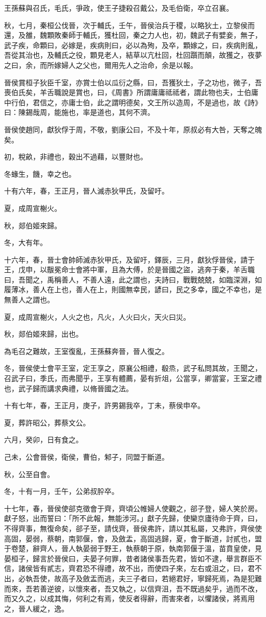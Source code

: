 \begin{pinyinscope}
王孫蘇與召氏，毛氏，爭政，使王子捷殺召戴公，及毛伯衛，卒立召襄。

秋，七月，秦桓公伐晉，次于輔氏，壬午，晉侯治兵于稷，以略狄土，立黎侯而還，及雒，魏顆敗秦師于輔氏，獲杜回，秦之力人也，初，魏武子有嬖妾，無子，武子疾，命顆曰，必嫁是，疾病則曰，必以為殉，及卒，顆嫁之，曰，疾病則亂，吾從其治也，及輔氏之役，顆見老人，結草以亢杜回，杜回躓而顛，故獲之，夜夢之曰，余，而所嫁婦人之父也，爾用先人之治命，余是以報。

晉侯賞桓子狄臣千室，亦賞士伯以瓜衍之縣，曰，吾獲狄土，子之功也，微子，吾喪伯氏矣，羊舌職說是賞也，曰，《周書》所謂庸庸祗祗者，謂此物也夫，士伯庸中行伯，君信之，亦庸士伯，此之謂明德矣，文王所以造周，不是過也，故《詩》曰：陳錫哉周，能施也，率是道也，其何不濟。

晉侯使趙同，獻狄俘于周，不敬，劉康公曰，不及十年，原叔必有大咎，天奪之魄矣。

初，稅畝，非禮也，穀出不過藉，以豐財也。

冬蝝生，饑，幸之也。

十有六年，春，王正月，晉人滅赤狄甲氏，及留吁。

夏，成周宣榭火。

秋，郯伯姬來歸。

冬，大有年。

十六年，春，晉士會帥師滅赤狄甲氏，及留吁，鐸辰，三月，獻狄俘晉侯，請于王，戊申，以黻冕命士會將中軍，且為大傅，於是晉國之盜，逃奔于秦，羊舌職曰，吾聞之，禹稱善人，不善人遠，此之謂也，夫詩曰，戰戰兢兢，如臨深淵，如履薄冰，善人在上也，善人在上，則國無幸民，諺曰，民之多幸，國之不幸也，是無善人之謂也。

夏，成周宣榭火，人火之也，凡火，人火曰火，天火曰災。

秋，郯伯姬來歸，出也。

為毛召之難故，王室復亂，王孫蘇奔晉，晉人復之。

冬，晉侯使士會平王室，定王享之，原襄公相禮，殽烝，武子私問其故，王聞之，召武子曰，季氏，而弗聞乎，王享有體薦，晏有折俎，公當享，卿當宴，王室之禮也，武子歸而講求典禮，以脩晉國之法。

十有七年，春，王正月，庚子，許男錫我卒，丁未，蔡侯申卒。

夏，葬許昭公，葬蔡文公。

六月，癸卯，日有食之。

己未，公會晉侯，衛侯，曹伯，邾子，同盟于斷道。

秋，公至自會。

冬，十有一月，壬午，公弟叔肸卒。

十七年，春，晉侯使郤克徵會于齊，齊頃公帷婦人使觀之，郤子登，婦人笑於房。獻子怒，出而誓曰：「所不此報，無能涉河。」獻子先歸，使欒京廬待命于齊，曰，不得齊事，無復命矣，郤子至，請伐齊，晉侯弗許，請以其私屬，又弗許，齊侯使高固，晏弱，蔡朝，南郭偃，會，及斂盂，高固逃歸，夏，會于斷道，討貳也，盟于卷楚，辭齊人，晉人執晏弱于野王，執蔡朝于原，執南郭偃于溫，苗賁皇使，見晏桓子，歸言於晉侯曰，夫晏子何罪，昔者諸侯事吾先君，皆如不逮，舉言群臣不信，諸侯皆有貳志，齊君恐不得禮，故不出，而使四子來，左右或沮之，曰，君不出，必執吾使，故高子及斂盂而逃，夫三子者曰，若絕君好，寧歸死焉，為是犯難而來，吾若善逆彼，以懷來者，吾又執之，以信齊沮，吾不既過矣乎，過而不改，而又久之，以成其悔，何利之有焉，使反者得辭，而害來者，以懼諸侯，將焉用之，晉人緩之，逸。


\end{pinyinscope}
